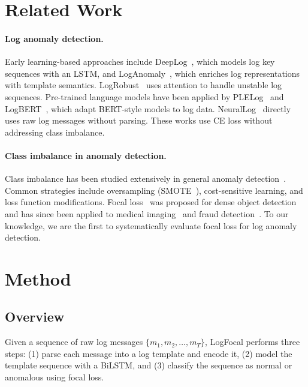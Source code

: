 \documentclass[conference]{IEEEtran}
\begin{document}
\section{Related Work}\label{sec:related}

\paragraph{Log anomaly detection.}
Early learning-based approaches include DeepLog~\cite{du2017deeplog}, which models log key sequences with an LSTM,
and LogAnomaly~\cite{meng2019loganomaly}, which enriches log representations with template semantics.
LogRobust~\cite{zhang2019robust} uses attention to handle unstable log sequences.
Pre-trained language models have been applied by PLELog~\cite{yang2021plelog}
and LogBERT~\cite{guo2021logbert}, which adapt BERT-style models to log data.
NeuralLog~\cite{le2021neurallog} directly uses raw log messages without parsing.
These works use CE loss without addressing class imbalance.

\paragraph{Class imbalance in anomaly detection.}
Class imbalance has been studied extensively in general anomaly detection~\cite{he2009learning}.
Common strategies include oversampling (SMOTE~\cite{chawla2002smote}),
cost-sensitive learning, and loss function modifications.
Focal loss~\cite{lin2017focal} was proposed for dense object detection
and has since been applied to medical imaging~\cite{yeung2022focalloss_medical}
and fraud detection~\cite{johnson2019focalloss_fraud}.
To our knowledge, we are the first to systematically evaluate focal loss for log anomaly detection.

\section{Method}\label{sec:method}

\subsection{Overview}\label{sec:overview}

Given a sequence of raw log messages $\{m_1, m_2, \ldots, m_T\}$,
LogFocal performs three steps:
(1) parse each message into a log template and encode it,
(2) model the template sequence with a BiLSTM,
and (3) classify the sequence as normal or anomalous using focal loss.
\end{document}
